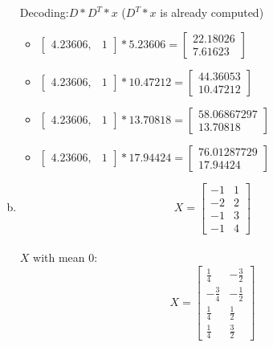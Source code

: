 \documentclass[12pt]{article}
\begin{document}
\begin{enumerate}[a)]
\begin{itemize}
        		\end{itemize}
        		Decoding:$D*D^T*x$ ($D^T*x$ is already computed)\\
        		\begin{itemize}
        			\item $\begin{bmatrix} 4.23606, & 1  \end{bmatrix}*5.23606= \begin{bmatrix} 22.18026 \\7.61623 \end{bmatrix}$
        			\item $\begin{bmatrix} 4.23606, & 1  \end{bmatrix}*10.47212= \begin{bmatrix} 44.36053 \\10.47212  \end{bmatrix}$ 
        			\item $\begin{bmatrix} 4.23606, & 1  \end{bmatrix}*13.70818= \begin{bmatrix} 58.06867297 \\ 13.70818 \end{bmatrix}$ 
        			\item $\begin{bmatrix} 4.23606, & 1  \end{bmatrix}*17.94424= \begin{bmatrix} 76.01287729 \\ 17.94424 \end{bmatrix}$  
        		\end{itemize}
        		\newpage
    \item
        $$X =\begin{bmatrix} -1&1 \\ -2&2 \\ -1 & 3 \\ -1 & 4 \end{bmatrix}$$\\
        $X$ with mean $0$:\\
        $$X =\begin{bmatrix} \frac{1}{4}& -\frac{3}{2} \\ -\frac{3}{4}&-\frac{1}{2} \\ \frac{1}{4} & \frac{1}{2} \\ \frac{1}{4} & \frac{3}{2} \end{bmatrix}$$\\

\end{enumerate}
\end{document}
